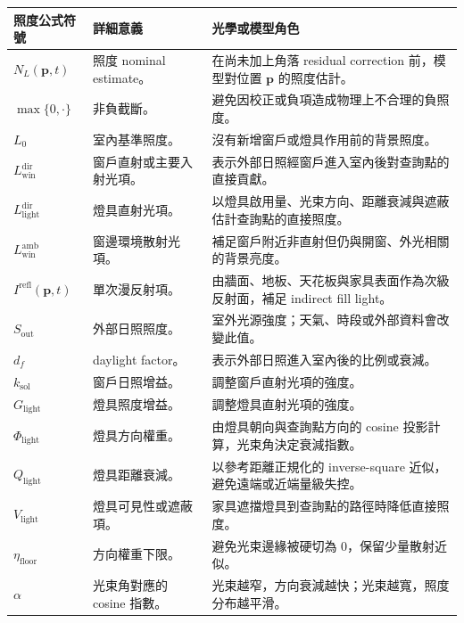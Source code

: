 \documentclass[12pt,a4paper]{article}
\begin{document}
\begin{table}[htbp]
\centering
\footnotesize
\renewcommand{\arraystretch}{1.25}
\begin{tabular}{|>{\raggedright\arraybackslash}p{}|>{\raggedright\arraybackslash}p{}|>{\raggedright\arraybackslash}p{}|}
\hline
\textbf{照度公式符號} & \textbf{詳細意義} & \textbf{光學或模型角色} \\
\hline
$N_L(\mathbf{p},t)$ & 照度 nominal estimate。 & 在尚未加上角落 residual correction 前，模型對位置 $\mathbf{p}$ 的照度估計。 \\
\hline
$\max\{0,\cdot\}$ & 非負截斷。 & 避免因校正或負項造成物理上不合理的負照度。 \\
\hline
$L_0$ & 室內基準照度。 & 沒有新增窗戶或燈具作用前的背景照度。 \\
\hline
$L_{\mathrm{win}}^{\mathrm{dir}}$ & 窗戶直射或主要入射光項。 & 表示外部日照經窗戶進入室內後對查詢點的直接貢獻。 \\
\hline
$L_{\mathrm{light}}^{\mathrm{dir}}$ & 燈具直射光項。 & 以燈具啟用量、光束方向、距離衰減與遮蔽估計查詢點的直接照度。 \\
\hline
$L_{\mathrm{win}}^{\mathrm{amb}}$ & 窗邊環境散射光項。 & 補足窗戶附近非直射但仍與開窗、外光相關的背景亮度。 \\
\hline
$I^{\mathrm{refl}}(\mathbf{p},t)$ & 單次漫反射項。 & 由牆面、地板、天花板與家具表面作為次級反射面，補足 indirect fill light。 \\
\hline
$S_{\mathrm{out}}$ & 外部日照照度。 & 室外光源強度；天氣、時段或外部資料會改變此值。 \\
\hline
$d_f$ & daylight factor。 & 表示外部日照進入室內後的比例或衰減。 \\
\hline
$k_{\mathrm{sol}}$ & 窗戶日照增益。 & 調整窗戶直射光項的強度。 \\
\hline
$G_{\mathrm{light}}$ & 燈具照度增益。 & 調整燈具直射光項的強度。 \\
\hline
$\Phi_{\mathrm{light}}$ & 燈具方向權重。 & 由燈具朝向與查詢點方向的 cosine 投影計算，光束角決定衰減指數。 \\
\hline
$Q_{\mathrm{light}}$ & 燈具距離衰減。 & 以參考距離正規化的 inverse-square 近似，避免遠端或近端量級失控。 \\
\hline
$V_{\mathrm{light}}$ & 燈具可見性或遮蔽項。 & 家具遮擋燈具到查詢點的路徑時降低直接照度。 \\
\hline
$\eta_{\mathrm{floor}}$ & 方向權重下限。 & 避免光束邊緣被硬切為 0，保留少量散射近似。 \\
\hline
$\alpha$ & 光束角對應的 cosine 指數。 & 光束越窄，方向衰減越快；光束越寬，照度分布越平滑。 \\

\end{tabular}
\end{table}
\end{document}
